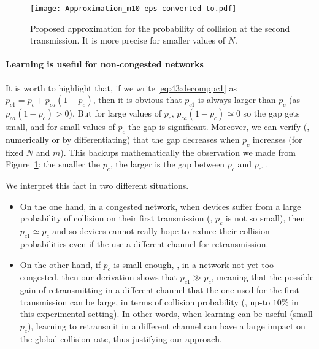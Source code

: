 \begin{figure}[htp!]  %
	\centering
	\texttt{[image: Approximation\_m10-eps-converted-to.pdf]}
	\caption[Proposed approximation for the probability of collision at the second transmission]{Proposed approximation for the probability of collision at the second transmission. It is more precise for smaller values of $N$.}
	\label{fig:43:Approximation_m10}
\end{figure}


\paragraph{Learning is useful for non-congested networks}

It is worth to highlight that, if we write \eqref{eq:43:decomppc1} as $p_{c1} = p_c + p_{ca} \left(1-p_c\right)$,
then it is obvious that $p_{c1}$ is always larger than $p_c$ (as $p_{ca} \left(1-p_c\right) > 0$).
But for large values of $p_c$, $p_{ca}\left(1-p_c\right) \simeq 0$ so the gap gets small,
and for small values of $p_c$ the gap is significant.
Moreover, we can verify (\eg, numerically or by differentiating)
that the gap decreases when $p_c$ increases (for fixed $N$ and $m$).
This backups mathematically the observation we made from Figure~\ref{fig:43:Approximation_m10}:
the smaller the $p_c$, the larger is the gap between $p_c$ and $p_{c1}$.

We interpret this fact in two different situations.
\begin{itemize}
	\item
	On the one hand, in a congested network, when devices suffer from a large probability of collision on their first transmission (\ie, $p_c$ is not so small), then $p_{c1}\simeq p_c$ and so devices cannot really hope to reduce their collision probabilities even if the use a different channel for retransmission.
	\item
	On the other hand, if $p_c$ is small enough, \ie, in a network not yet too congested, then our derivation shows that $p_{c1} \gg p_c$, meaning that the possible gain of retransmitting in a different channel that the one used for the first transmission can be large, in terms of collision probability (\eg, up-to $10\%$ in this experimental setting).
	In other words, when learning can be useful (small $p_c$), learning to retransmit in a different channel can have a large impact on the global collision rate,
	thus justifying our approach.
\end{itemize}


